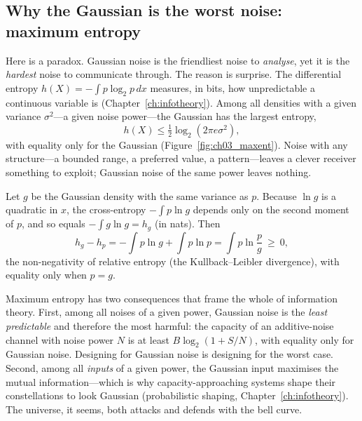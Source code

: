 \subsection{Why the Gaussian is the worst noise: maximum entropy}

Here is a paradox. Gaussian noise is the friendliest noise to \emph{analyse}, yet it is the
\emph{hardest} noise to communicate through. The reason is surprise. The differential entropy
$h(X)=-\int p\log_2p\,dx$ measures, in bits, how unpredictable a continuous variable is
(Chapter~\ref{ch:infotheory}). Among all densities with a given variance $\sigma^2$---a given noise
power---the Gaussian has the largest entropy,
\begin{equation}
h(X)\le\tfrac12\log_2\!\left(2\pi e\sigma^2\right),
\label{eq:ch03:maxent}
\end{equation}
with equality only for the Gaussian (Figure~\ref{fig:ch03_maxent}). Noise with any structure---a
bounded range, a preferred value, a pattern---leaves a clever receiver something to exploit;
Gaussian noise of the same power leaves nothing.


\begin{deeper}
Let $g$ be the Gaussian density with the same variance as $p$. Because $\ln g$ is a quadratic in
$x$, the cross-entropy $-\int p\ln g$ depends only on the second moment of $p$, and so equals
$-\int g\ln g=h_g$ (in nats). Then
\[
h_g-h_p=-\int p\ln g+\int p\ln p=\int p\ln\frac{p}{g}\ \ge\ 0,
\]
the non-negativity of relative entropy (the Kullback--Leibler divergence), with equality only when
$p=g$.
\end{deeper}

Maximum entropy has two consequences that frame the whole of information theory. First, among all
noises of a given power, Gaussian noise is the \emph{least predictable} and therefore the most
harmful: the capacity of an additive-noise channel with noise power $N$ is at least
$B\log_2(1+S/N)$, with equality only for Gaussian noise. Designing for Gaussian noise is designing
for the worst case. Second, among all \emph{inputs} of a given power, the Gaussian input maximises
the mutual information---which is why capacity-approaching systems shape their constellations to
look Gaussian (probabilistic shaping, Chapter~\ref{ch:infotheory}). The universe, it seems, both
attacks and defends with the bell curve.

